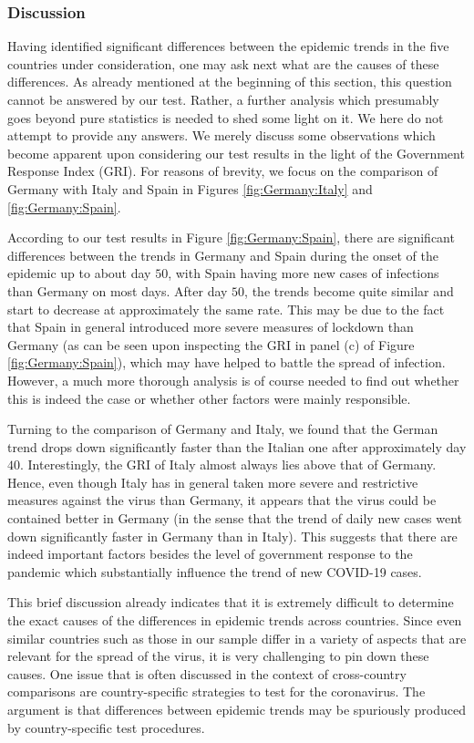 \documentclass[a4paper,12pt]{article}
\numberwithin{equation}{section}
\begin{document}
\subsubsection{Discussion}


Having identified significant differences between the epidemic trends in the five countries under consideration, one may ask next what are the causes of these differences. As already mentioned at the beginning of this section, this question cannot be answered by our test. Rather, a further analysis which presumably goes beyond pure statistics is needed to shed some light on it. We here do not attempt to provide any answers. We merely discuss some observations which become apparent upon considering our test results in the light of the Government Response Index (GRI). For reasons of brevity, we focus on the comparison of Germany with Italy and Spain in Figures \ref{fig:Germany:Italy} and \ref{fig:Germany:Spain}. 


According to our test results in Figure \ref{fig:Germany:Spain}, there are significant differences between the trends in Germany and Spain during the onset of the epidemic up to about day $50$, with Spain having more new cases of infections than Germany on most days. After day $50$, the trends become quite similar and start to decrease at approximately the same rate. This may be due to the fact that Spain in general introduced more severe measures of lockdown than Germany (as can be seen upon inspecting the GRI in panel (c) of Figure \ref{fig:Germany:Spain}), which may have helped to battle the spread of infection. However, a much more thorough analysis is of course needed to find out whether this is indeed the case or whether other factors were mainly responsible. 


Turning to the comparison of Germany and Italy, we found that the German trend drops down significantly faster than the Italian one after approximately day $40$. Interestingly, the GRI of Italy almost always lies above that of Germany. Hence, even though Italy has in general taken more severe and restrictive measures against the virus than Germany, it appears that the virus could be contained better in Germany (in the sense that the trend of daily new cases went down significantly faster in Germany than in Italy). This suggests that there are indeed important factors besides the level of government response to the pandemic which substantially influence the trend of new COVID-19 cases. 


This brief discussion already indicates that it is extremely difficult to determine the exact causes of the differences in epidemic trends across countries. Since even similar countries such as those in our sample differ in a variety of aspects that are relevant for the spread of the virus, it is very challenging to pin down these causes. One issue that is often discussed in the context of cross-country comparisons are country-specific strategies to test for the coronavirus. The argument is that differences between epidemic trends may be spuriously produced by country-specific test procedures.
\end{document}

